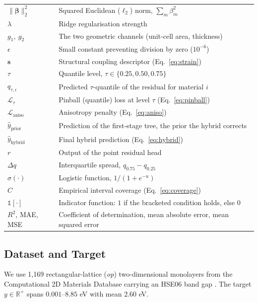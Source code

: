 \documentclass{ieeeaccess}
\begin{document}
\begin{table}[!t]
\begin{tabular}{@{}p{}p{}@{}}
$\lVert \boldsymbol{\beta} \rVert_2^2$ & Squared Euclidean ($\ell_2$) norm, $\sum_m \beta_m^2$ \\
$\lambda$ & Ridge regularisation strength \\
$g_1,\ g_2$ & The two geometric channels (unit-cell area, thickness) \\
$\epsilon$ & Small constant preventing division by zero ($10^{-6}$) \\
$\mathbf{s}$ & Structural coupling descriptor (Eq.~\eqref{eq:strain}) \\
$\tau$ & Quantile level, $\tau \in \{0.25, 0.50, 0.75\}$ \\
$q_{\tau,i}$ & Predicted $\tau$-quantile of the residual for material $i$ \\
$\mathcal{L}_\tau$ & Pinball (quantile) loss at level $\tau$ (Eq.~\eqref{eq:pinball}) \\
$\mathcal{L}_{\mathrm{aniso}}$ & Anisotropy penalty (Eq.~\eqref{eq:aniso}) \\
$\hat{y}_{\mathrm{prior}}$ & Prediction of the first-stage tree, the prior the hybrid corrects \\
$\hat{y}_{\mathrm{hybrid}}$ & Final hybrid prediction (Eq.~\eqref{eq:hybrid}) \\
$r$ & Output of the point residual head \\
$\Delta q$ & Interquartile spread, $q_{0.75}-q_{0.25}$ \\
$\sigma(\cdot)$ & Logistic function, $1/(1+e^{-u})$ \\
$C$ & Empirical interval coverage (Eq.~\eqref{eq:coverage}) \\
$\mathbb{1}[\cdot]$ & Indicator function: $1$ if the bracketed condition holds, else $0$ \\
$R^2$, MAE, MSE & Coefficient of determination, mean absolute error, mean squared error \\
\bottomrule
\end{tabular}
\end{table}



\subsection{Dataset and Target}
We use 1{,}169 rectangular-lattice (\textit{op}) two-dimensional monolayers from the Computational 2D Materials Database \cite{haastrup2018c2db} carrying an HSE06 band gap \cite{heyd2003hybrid}. The target $y \in \mathbb{R}^+$ spans $0.001$--$8.85$ eV with mean $2.60$ eV.
\end{document}

